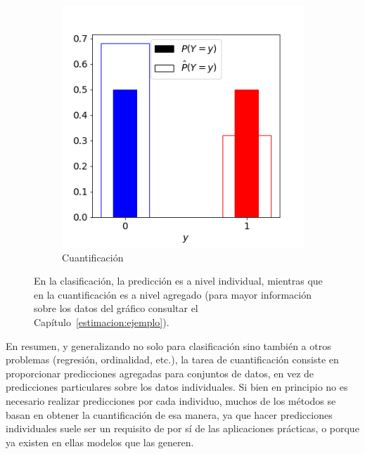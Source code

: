 \begin{figure}[!h]
\begin{subfigure}[t]{0.45\textwidth}
        \includegraphics[width=\textwidth]{../plots_teoria/intro_barplot.png}
        \caption{Cuantificación}
    \end{subfigure}
    \caption{En la clasificación, la predicción es a nivel individual, mientras
    que en la cuantificación es a nivel agregado (para mayor información sobre
    los datos del gráfico consultar el
    Capítulo~\ref{estimacion:ejemplo}).}\label{fig:intro}
\end{figure}

En resumen, y generalizando no solo para clasificación sino también a otros
problemas (regresión, ordinalidad, etc.), la tarea de cuantificación consiste en
proporcionar predicciones agregadas para conjuntos de datos, en vez de
predicciones particulares sobre los datos individuales. Si bien en principio no
es necesario realizar predicciones por cada individuo, muchos de los métodos se
basan en obtener la cuantificación de esa manera, ya que hacer predicciones
individuales suele ser un requisito de por sí de las aplicaciones prácticas, o
porque ya existen en ellas modelos que las generen.

